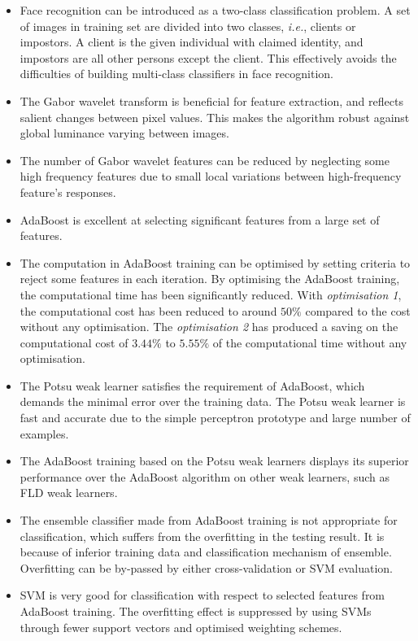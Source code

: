\begin{itemize}
 \item Face recognition can be introduced as a two-class classification problem. A set of images in training set are divided into two classes, \textit{i.e.}, clients or impostors. A client is the given individual with claimed identity, and impostors are all other persons except the client. This effectively avoids the difficulties of building multi-class classifiers in face recognition.
 \item The Gabor wavelet transform is beneficial for feature extraction, and reflects salient changes between pixel values. This makes the algorithm robust against global luminance varying between images.
 \item The number of Gabor wavelet features can be reduced by neglecting some high frequency features due to small local variations between high-frequency feature's responses.
 \item AdaBoost is excellent at selecting significant features from a large set of features. 
 \item The computation in AdaBoost training can be optimised by setting criteria to reject some features in each iteration. By optimising the AdaBoost training, the computational time has been significantly reduced. With \textit{optimisation 1}, the computational cost has been reduced to around $50\%$ compared to the cost without any optimisation. The \textit{optimisation 2} has produced a saving on the computational cost of $3.44\%$ to $5.55\%$ of the computational time without any optimisation.
 \item The Potsu weak learner satisfies the requirement of AdaBoost, which demands the minimal error over the training data. The Potsu weak learner is fast and accurate due to the simple perceptron prototype and large number of examples.
 \item The AdaBoost training based on the Potsu weak learners displays its superior performance over the AdaBoost algorithm on other weak learners, such as FLD weak learners.
 \item The ensemble classifier made from AdaBoost training is not appropriate for classification, which suffers from the overfitting in the testing result. It is because of inferior training data and classification mechanism of ensemble. Overfitting can be by-passed by either cross-validation or SVM evaluation.
 \item SVM is very good for classification with respect to selected features from AdaBoost training. The overfitting effect is suppressed by using SVMs through fewer support vectors and optimised weighting schemes.

\end{itemize}
